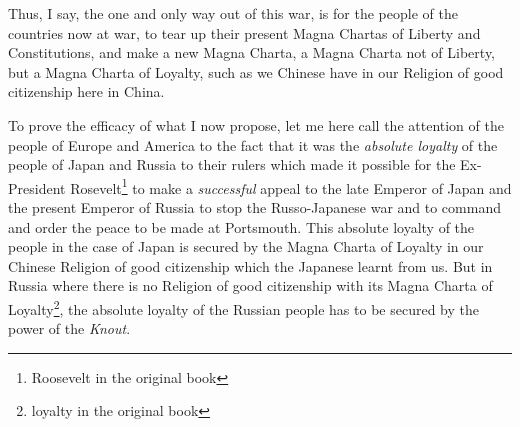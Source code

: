 Thus, I say, the one and only way out of this war, is for the people of the countries now at war, to tear up their present Magna Chartas of Liberty and Constitutions, and make a new Magna Charta, a Magna Charta not of Liberty, but a Magna Charta of Loyalty, such as we Chinese have in our Religion of good citizenship here in China.

To prove the efficacy of what I now propose, let me here call the attention of the people of Europe and America to the fact that it was the \emph{absolute loyalty} of the people of Japan and Russia to their rulers which made it possible for the Ex-President Rosevelt\footnote{Roosevelt in the original book} to make a \emph{successful} appeal to the late Emperor of Japan and the present Emperor of Russia to stop the Russo-Japanese war and to command and order the peace to be made at Portsmouth. 
This absolute loyalty of the people in the case of Japan is secured by the Magna Charta of Loyalty in our Chinese Religion of good citizenship which the Japanese learnt from us.
But in Russia where there is no Religion of good citizenship with its Magna Charta of Loyalty\footnote{loyalty in the original book}, the absolute loyalty of the Russian people has to be secured by the power of the \emph{Knout}.

